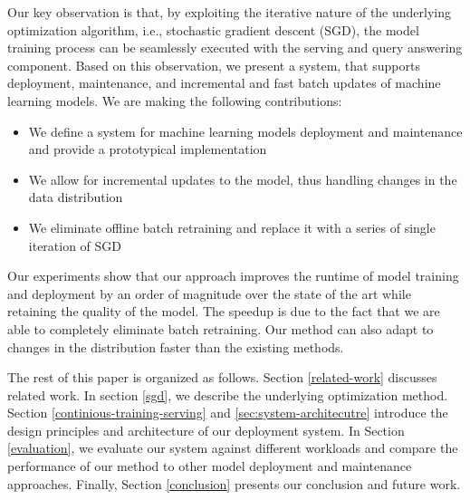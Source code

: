 \documentclass{vldb}
\begin{document}
Our key observation is that, by exploiting the iterative nature of the underlying optimization algorithm, i.e., stochastic gradient descent (SGD), the model training process can be seamlessly executed with the serving and query answering component.
Based on this observation, we present a system, that supports deployment, maintenance, and incremental and fast batch updates of machine learning models.
We are making the following contributions: 
\begin{itemize}
\item We define a system for machine learning models deployment and maintenance and provide a prototypical implementation
\item We allow for incremental updates to the model, thus handling changes in the data distribution
\item We eliminate offline batch retraining and replace it with a series of single iteration of SGD
\end{itemize}
Our experiments show that our approach improves the runtime of model training and deployment by an order of magnitude over the state of the art while retaining the quality of the model. 
The speedup is due to the fact that we are able to completely eliminate batch retraining. 
Our method can also adapt to changes in the distribution faster than the existing methods.

The rest of this paper is organized as follows. 
Section \ref {related-work} discusses related work.
In section \ref{sgd}, we describe the underlying optimization method.
Section \ref{continious-training-serving} and \ref{sec:system-architecutre} introduce the design principles and architecture of our deployment system.
In Section \ref{evaluation}, we evaluate our system against different workloads and compare the performance of our method to other model deployment and maintenance approaches. 
Finally, Section \ref{conclusion} presents our conclusion and future work.
\end{document}
